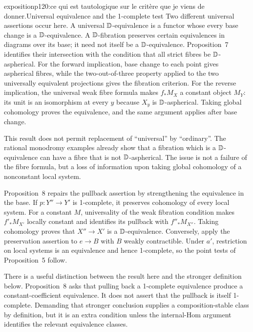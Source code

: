 \begin{dcomment}{exposition}{p120:ce qui est tautologique sur le critère que je viens de donner.}{Universal equivalence and the 1-complete test}
Two different universal assertions occur here. A universal $\mathbb{D}$-equivalence is a functor whose every base change is a $\mathbb{D}$-equivalence. A $\mathbb{D}$-fibration preserves certain equivalences in diagrams over its base; it need not itself be a $\mathbb{D}$-equivalence. Proposition~7 identifies their intersection with the condition that all strict fibres be $\mathbb{D}$-aspherical. For the forward implication, base change to each point gives aspherical fibres, while the two-out-of-three property applied to the two universally equivalent projections gives the fibration criterion. For the reverse implication, the universal weak fibre formula makes $f_*M_X$ a constant object $M_Y$: its unit is an isomorphism at every $y$ because $X_y$ is $\mathbb{D}$-aspherical. Taking global cohomology proves the equivalence, and the same argument applies after base change.

This result does not permit replacement of ``universal'' by ``ordinary''. The rational monodromy examples already show that a fibration which is a $\mathbb{D}$-equivalence can have a fibre that is not $\mathbb{D}$-aspherical. The issue is not a failure of the fibre formula, but a loss of information upon taking global cohomology of a nonconstant local system.

Proposition~8 repairs the pullback assertion by strengthening the equivalence in the base. If $p:Y''\to Y'$ is 1-complete, it preserves cohomology of every local system. For a constant $M$, universality of the weak fibration condition makes $f'_*M_{X'}$ locally constant and identifies its pullback with $f''_*M_{X''}$. Taking cohomology proves that $X''\to X'$ is a $\mathbb{D}$-equivalence. Conversely, apply the preservation assertion to $e\to B$ with $B$ weakly contractible. Under $a'$, restriction on local systems is an equivalence and hence 1-complete, so the point tests of Proposition~5 follow.

There is a useful distinction between the result here and the stronger definition below. Proposition~8 asks that pulling back a 1-complete equivalence produce a constant-coefficient equivalence. It does not assert that the pullback is itself 1-complete. Demanding that stronger conclusion supplies a composition-stable class by definition, but it is an extra condition unless the internal-Hom argument identifies the relevant equivalence classes.
\end{dcomment}


